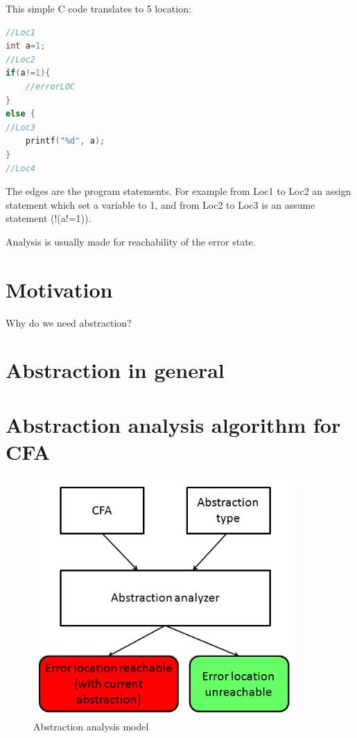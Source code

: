 \label{fig:simpleC}This simple C code translates to 5 location:
\begin{lstlisting}[language=C,breaklines=true]
//Loc1
int a=1;
//Loc2
if(a!=1){
	//errorLOC
}
else {
//Loc3
	printf("%d", a);
}
//Loc4
\end{lstlisting}

The edges are the program statements. For example from Loc1 to Loc2 an assign statement which set a variable to 1, and from Loc2 to Loc3 is an assume statement (!(a!=1)).

Analysis is usually made for reachability of the error state.


\section{Motivation}
\label{sec:motibation}

Why do we need abstraction? 

\section{Abstraction in general}
\label{sec:general}

\section{Abstraction analysis algorithm for CFA}
\label{sec:cfaalgorithm}

\begin{figure} [!ht]
	\centering
	\includegraphics[width=100mm, keepaspectratio]{figures/abstractanalyzer.png}
	\caption{\label{fig:absanalyzer} Abstraction analysis model}
\end{figure}

